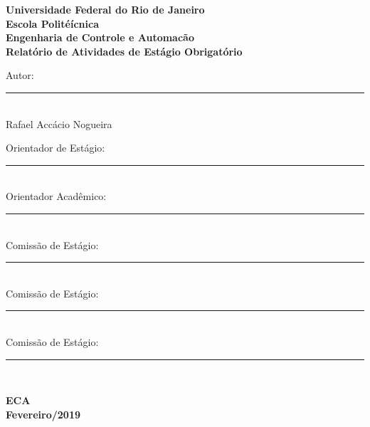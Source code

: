 \begin{titlepage}
  \vspace{30mm}

\begin{center}
\textbf{Universidade Federal do Rio de Janeiro\\[4mm]
Escola Politéícnica\\[4mm]
Engenharia de Controle e Automacão\\[15mm]}
\textbf{Relatório de Atividades de Estágio Obrigatório}
\end{center}

\vfill

Autor:\rule[-0.5mm]{124mm}{0.2mm}\\
{\centering Rafael Accácio Nogueira\\[6mm]}

Orientador de Estágio:\rule[-0.5mm]{97mm}{0.2mm}\\

Orientador Acadêmico:\rule[-0.5mm]{96mm}{0.2mm}\\

Comissão de Estágio:\rule[-0.5mm]{100mm}{0.2mm}\\

Comissão de Estágio:\rule[-0.5mm]{100mm}{0.2mm}\\

Comissão de Estágio:\rule[-0.5mm]{100mm}{0.2mm}\\

\vfill


\begin{center}
\textbf{ECA\\[3mm]
Fevereiro/2019}
\end{center}
\end{titlepage}

